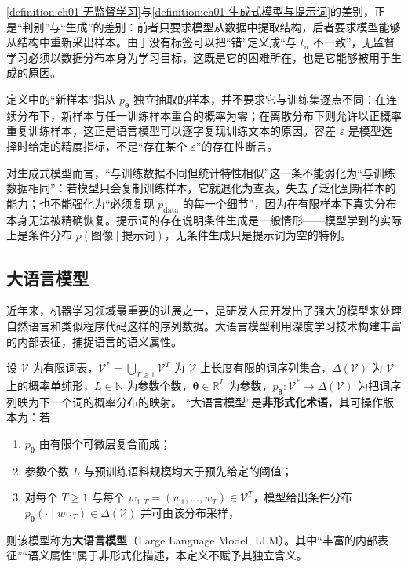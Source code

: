 \documentclass[../../main.tex]{subfiles}
\begin{document}
\begin{remark}
\cref{definition:ch01-无监督学习}与\cref{definition:ch01-生成式模型与提示词}的差别，正是“判别”与“生成”的差别：前者只要求模型从数据中提取结构，后者要求模型能够从结构中重新采出样本。由于没有标签可以把“错”定义成“与 $t_n$ 不一致”，无监督学习必须以数据分布本身为学习目标，这既是它的困难所在，也是它能够被用于生成的原因。

定义中的“新样本”指从 $p_{\boldsymbol{\theta}}$ 独立抽取的样本，并不要求它与训练集逐点不同：在连续分布下，新样本与任一训练样本重合的概率为零；在离散分布下则允许以正概率重复训练样本，这正是语言模型可以逐字复现训练文本的原因。容差 $\varepsilon$ 是模型选择时给定的精度指标，不是“存在某个 $\varepsilon$”的存在性断言。

对生成式模型而言，“与训练数据不同但统计特性相似”这一条不能弱化为“与训练数据相同”：若模型只会复制训练样本，它就退化为查表，失去了泛化到新样本的能力；也不能强化为“必须复现 $p_{\mathrm{data}}$ 的每一个细节”，因为在有限样本下真实分布本身无法被精确恢复。提示词的存在说明条件生成是一般情形——模型学到的实际上是条件分布 $p(\text{图像}\mid\text{提示词})$，无条件生成只是提示词为空的特例。
\end{remark}

\subsection{大语言模型}\label{subsection:ch01-大语言模型}

近年来，机器学习领域最重要的进展之一，是研发人员开发出了强大的模型来处理自然语言和类似程序代码这样的序列数据。大语言模型利用深度学习技术构建丰富的内部表征，捕捉语言的语义属性。

\begin{definition}[大语言模型]\label{definition:ch01-大语言模型}
设 $\mathcal{V}$ 为有限词表，$\mathcal{V}^{*}=\bigcup_{T\geqslant1}\mathcal{V}^{T}$ 为 $\mathcal{V}$ 上长度有限的词序列集合，$\Delta(\mathcal{V})$ 为 $\mathcal{V}$ 上的概率单纯形，$L\in\mathbb{N}$ 为参数个数，$\boldsymbol{\theta}\in\mathbb{R}^{L}$ 为参数，$p_{\boldsymbol{\theta}}:\mathcal{V}^{*}\to\Delta(\mathcal{V})$ 为把词序列映为下一个词的概率分布的映射。
“大语言模型”是\textbf{非形式化术语}，其可操作版本为：若
\begin{enumerate}
  \item $p_{\boldsymbol{\theta}}$ 由有限个可微层复合而成；
  \item 参数个数 $L$ 与预训练语料规模均大于预先给定的阈值；
  \item 对每个 $T\geqslant1$ 与每个 $w_{1:T}=(w_{1},\dots,w_{T})\in\mathcal{V}^{T}$，模型给出条件分布 $p_{\boldsymbol{\theta}}(\cdot\mid w_{1:T})\in\Delta(\mathcal{V})$ 并可由该分布采样，
\end{enumerate}
则该模型称为\textbf{大语言模型}（Large Language Model, LLM）。其中“丰富的内部表征”“语义属性”属于非形式化描述，本定义不赋予其独立含义。
\end{definition}
\end{document}
